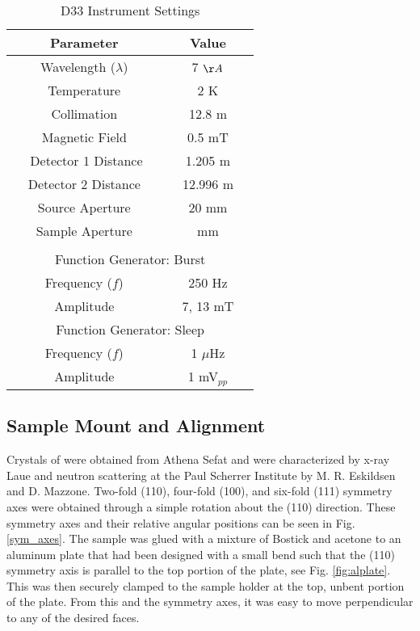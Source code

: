 \documentclass[aps, prl, reprint, groupedaddress, superscriptaddress, twocolumn]{revtex4-1}
\begin{document}
		\begin{table}
			\begin{tabular}{|c|c|}
			\hline 
			Parameter					&		Value			\\
			\hline \hline
			Wavelength ($\lambda$)		&		7 $\AA$			\\
			Temperature 				&		2 K			\\
			Collimation				&		 12.8 m			\\
			Magnetic Field				&		0.5 mT			\\
			~~ Detector 1 Distance~~		&	~~  1.205 m ~~			\\
			Detector 2	 Distance			&		12.996 m			\\
			Source Aperture			&		 20 mm			\\
			Sample Aperture			&		 mm			\\
			\hline
			\multicolumn{2}{c}{} 									\\	
			\hline		
			\multicolumn{2}{|c|}{Function Generator: Burst} 				\\
			\hline
			Frequency ($f$)			&		250 Hz			\\
			Amplitude					&		7, 13 mT			\\
			\hline
			\multicolumn{2}{|c|}{Function Generator: Sleep}			 	\\
			\hline
			Frequency ($f$)			&		1 $\mu$Hz		\\
			Amplitude					&		1 mV$_{pp}$		\\		
			\hline 
			\end{tabular}
			\caption{D33 Instrument Settings}
			\label{Settings}
		\end{table}



	\subsection{Sample Mount and Alignment} 
	
	Crystals of \SIT were obtained from Athena Sefat and were characterized by x-ray Laue and neutron scattering at the Paul Scherrer Institute by M. R. Eskildsen and D. Mazzone.  
	Two-fold (110), four-fold (100), and six-fold (111) symmetry axes were obtained through a simple rotation about the (110) direction.  
	These symmetry axes and their relative angular positions can be seen in Fig. \ref{sym_axes}.  
	The sample was glued with a mixture of Bostick and acetone to an aluminum plate that had been designed with a small bend such that the (110) symmetry axis is parallel to the top portion of the plate, see Fig. \ref{fig:alplate}.  
	This was then securely clamped to the sample holder at the top, unbent portion of the plate.  From this and the \SIT symmetry axes, it was easy to move perpendicular to any of the desired faces.  
	
\end{document}
